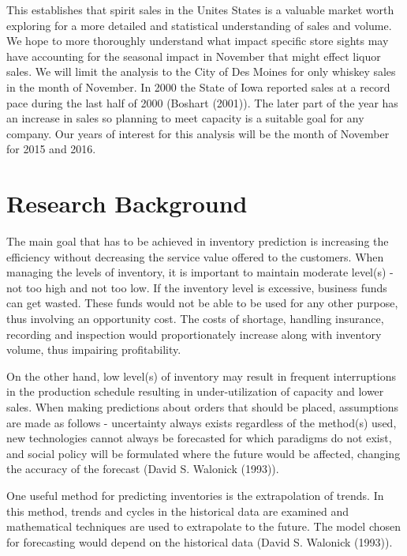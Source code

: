 \documentclass[]{elsarticle} %
\begin{document}
This establishes that spirit sales in the Unites States is a valuable
market worth exploring for a more detailed and statistical understanding
of sales and volume. We hope to more thoroughly understand what impact
specific store sights may have accounting for the seasonal impact in
November that might effect liquor sales. We will limit the analysis to
the City of Des Moines for only whiskey sales in the month of November.
In 2000 the State of Iowa reported sales at a record pace during the
last half of 2000 (Boshart (2001)). The later part of the year has an
increase in sales so planning to meet capacity is a suitable goal for
any company. Our years of interest for this analysis will be the month
of November for 2015 and 2016.

\section{Research Background}\label{research-background}

The main goal that has to be achieved in inventory prediction is
increasing the efficiency without decreasing the service value offered
to the customers. When managing the levels of inventory, it is important
to maintain moderate level(s) - not too high and not too low. If the
inventory level is excessive, business funds can get wasted. These funds
would not be able to be used for any other purpose, thus involving an
opportunity cost. The costs of shortage, handling insurance, recording
and inspection would proportionately increase along with inventory
volume, thus impairing profitability.

On the other hand, low level(s) of inventory may result in frequent
interruptions in the production schedule resulting in under-utilization
of capacity and lower sales. When making predictions about orders that
should be placed, assumptions are made as follows - uncertainty always
exists regardless of the method(s) used, new technologies cannot always
be forecasted for which paradigms do not exist, and social policy will
be formulated where the future would be affected, changing the accuracy
of the forecast (David S. Walonick (1993)).

One useful method for predicting inventories is the extrapolation of
trends. In this method, trends and cycles in the historical data are
examined and mathematical techniques are used to extrapolate to the
future. The model chosen for forecasting would depend on the historical
data (David S. Walonick (1993)).
\end{document}
